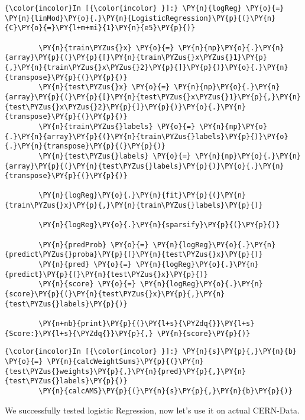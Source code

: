     \begin{Verbatim}[commandchars=\\\{\}]
{\color{incolor}In [{\color{incolor} }]:} \PY{n}{logReg} \PY{o}{=} \PY{n}{linMod}\PY{o}{.}\PY{n}{LogisticRegression}\PY{p}{(}\PY{n}{C}\PY{o}{=}\PY{l+m+mi}{1}\PY{n}{e5}\PY{p}{)}
        
        \PY{n}{train\PYZus{}x} \PY{o}{=} \PY{n}{np}\PY{o}{.}\PY{n}{array}\PY{p}{(}\PY{p}{[}\PY{n}{train\PYZus{}x\PYZus{}1}\PY{p}{,}\PY{n}{train\PYZus{}x\PYZus{}2}\PY{p}{]}\PY{p}{)}\PY{o}{.}\PY{n}{transpose}\PY{p}{(}\PY{p}{)}
        \PY{n}{test\PYZus{}x} \PY{o}{=} \PY{n}{np}\PY{o}{.}\PY{n}{array}\PY{p}{(}\PY{p}{[}\PY{n}{test\PYZus{}x\PYZus{}1}\PY{p}{,}\PY{n}{test\PYZus{}x\PYZus{}2}\PY{p}{]}\PY{p}{)}\PY{o}{.}\PY{n}{transpose}\PY{p}{(}\PY{p}{)}
        \PY{n}{train\PYZus{}labels} \PY{o}{=} \PY{n}{np}\PY{o}{.}\PY{n}{array}\PY{p}{(}\PY{n}{train\PYZus{}labels}\PY{p}{)}\PY{o}{.}\PY{n}{transpose}\PY{p}{(}\PY{p}{)}
        \PY{n}{test\PYZus{}labels} \PY{o}{=} \PY{n}{np}\PY{o}{.}\PY{n}{array}\PY{p}{(}\PY{n}{test\PYZus{}labels}\PY{p}{)}\PY{o}{.}\PY{n}{transpose}\PY{p}{(}\PY{p}{)}
        
        \PY{n}{logReg}\PY{o}{.}\PY{n}{fit}\PY{p}{(}\PY{n}{train\PYZus{}x}\PY{p}{,}\PY{n}{train\PYZus{}labels}\PY{p}{)}
        
        \PY{n}{logReg}\PY{o}{.}\PY{n}{sparsify}\PY{p}{(}\PY{p}{)}
        
        \PY{n}{predProb} \PY{o}{=} \PY{n}{logReg}\PY{o}{.}\PY{n}{predict\PYZus{}proba}\PY{p}{(}\PY{n}{test\PYZus{}x}\PY{p}{)}
        \PY{n}{pred} \PY{o}{=} \PY{n}{logReg}\PY{o}{.}\PY{n}{predict}\PY{p}{(}\PY{n}{test\PYZus{}x}\PY{p}{)}
        \PY{n}{score} \PY{o}{=} \PY{n}{logReg}\PY{o}{.}\PY{n}{score}\PY{p}{(}\PY{n}{test\PYZus{}x}\PY{p}{,}\PY{n}{test\PYZus{}labels}\PY{p}{)}
        
        \PY{n+nb}{print}\PY{p}{(}\PY{l+s}{\PYZdq{}}\PY{l+s}{Score:}\PY{l+s}{\PYZdq{}}\PY{p}{,} \PY{n}{score}\PY{p}{)}
\end{Verbatim}

    \begin{Verbatim}[commandchars=\\\{\}]
{\color{incolor}In [{\color{incolor} }]:} \PY{n}{s}\PY{p}{,}\PY{n}{b} \PY{o}{=} \PY{n}{calcWeightSums}\PY{p}{(}\PY{n}{test\PYZus{}weights}\PY{p}{,}\PY{n}{pred}\PY{p}{,}\PY{n}{test\PYZus{}labels}\PY{p}{)}
        \PY{n}{calcAMS}\PY{p}{(}\PY{n}{s}\PY{p}{,}\PY{n}{b}\PY{p}{)}
\end{Verbatim}

    We successfully tested logistic Regression, now let's use it on actual
CERN-Data.

